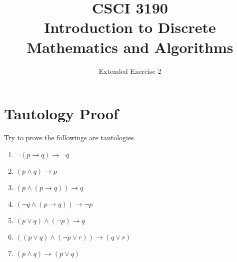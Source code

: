 \documentclass{../../cls/sig-alternate-05-2015}
\begin{document}






%

\title{CSCI 3190 \\ Introduction to Discrete Mathematics and Algorithms}
\subtitle{Extended Exercise 2}

\maketitle
\begin{abstract}

\end{abstract}

\keywords{}

\section{Tautology Proof}
Try to prove the followings are tautologies.
\begin{enumerate}
\item $\neg (p \rightarrow q) \rightarrow \neg q$
\item $(p \land q) \rightarrow p$
\item $(p \land (p \rightarrow q)) \rightarrow q$
\item $(\neg q \land (p \rightarrow q)) \rightarrow \neg p$
\item $ (p\lor q) \land (\neg p) \rightarrow q$
\item $ ((p \lor q) \land (\neg p \lor r)) \rightarrow (q \lor r)$
\item $(p \land q) \rightarrow (p \lor q)$
\end{enumerate}
\end{document}
